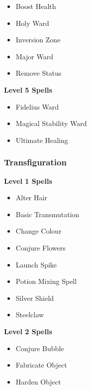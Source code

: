 \begin{multicols}{4}
\begin{itemize}[itemsep=0em]
\item Boost Health

\item Holy Ward

\item Inversion Zone

\item Major Ward

\item Remove Status


\end{itemize}
\textbf{Level 5 Spells}
\begin{itemize}[itemsep=0em]
\renewcommand\labelitemi{-}
\item Fidelius Ward

\item Magical Stability Ward

\item Ultimate Healing


\end{itemize}
\vfill\null
\columnbreak\subsubsection{Transfiguration}
\textbf{Level 1 Spells}
\begin{itemize}[itemsep=0em]
\renewcommand\labelitemi{-}
\item Alter Hair

\item Basic Transmutation

\item Change Colour

\item Conjure Flowers

\item Launch Spike

\item Potion Mixing Spell

\item Silver Shield

\item Steelclaw


\end{itemize}
\textbf{Level 2 Spells}
\begin{itemize}[itemsep=0em]
\renewcommand\labelitemi{-}
\item Conjure Bubble

\item Fabricate Object

\item Harden Object


\end{itemize}
\end{multicols}
